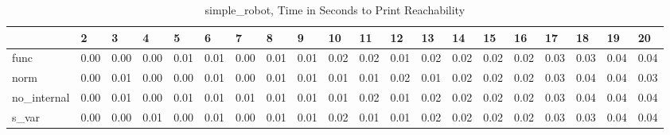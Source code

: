 \begin{table}
\centering
\caption{simple_robot, Time in Seconds to Print Reachability}
\label{simple_robot_states_time}
\begin{tabular}{llllllllllllllllllll}
\toprule
{} &     2 &     3 &     4 &     5 &     6 &     7 &     8 &     9 &    10 &    11 &    12 &    13 &    14 &    15 &    16 &    17 &    18 &    19 &    20 \\
\midrule
func        &  0.00 &  0.00 &  0.00 &  0.01 &  0.01 &  0.00 &  0.01 &  0.01 &  0.02 &  0.02 &  0.01 &  0.02 &  0.02 &  0.02 &  0.02 &  0.03 &  0.03 &  0.04 &  0.04 \\
norm        &  0.00 &  0.01 &  0.00 &  0.00 &  0.01 &  0.00 &  0.01 &  0.01 &  0.01 &  0.01 &  0.02 &  0.01 &  0.02 &  0.02 &  0.02 &  0.03 &  0.04 &  0.04 &  0.03 \\
no\_internal &  0.00 &  0.01 &  0.00 &  0.01 &  0.01 &  0.01 &  0.01 &  0.01 &  0.01 &  0.02 &  0.01 &  0.02 &  0.02 &  0.02 &  0.02 &  0.03 &  0.04 &  0.04 &  0.04 \\
s\_var       &  0.00 &  0.00 &  0.01 &  0.00 &  0.01 &  0.00 &  0.01 &  0.01 &  0.02 &  0.01 &  0.01 &  0.02 &  0.02 &  0.02 &  0.02 &  0.03 &  0.03 &  0.04 &  0.04 \\
\bottomrule
\end{tabular}
\end{table}
